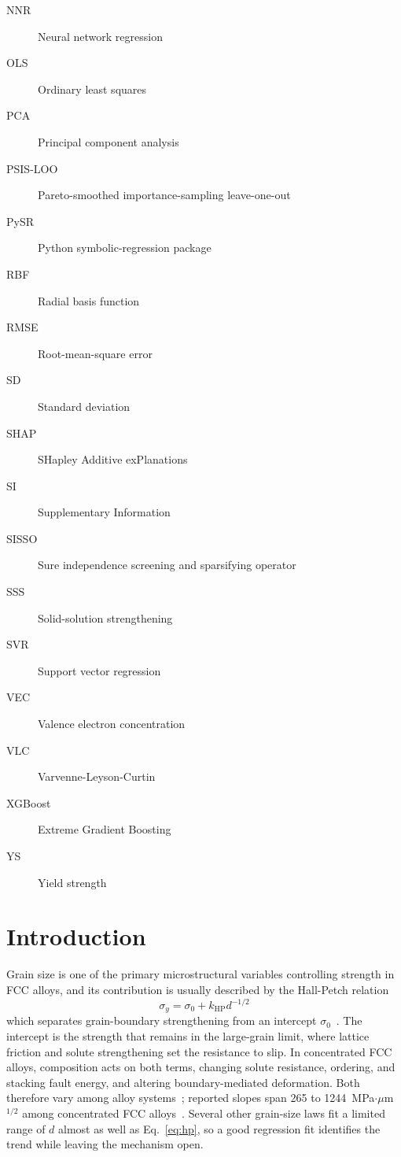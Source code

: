 \documentclass[5p,times,twocolumn]{elsarticle}
\begin{document}
{\begin{description}
\item[NNR] Neural network regression
\item[OLS] Ordinary least squares
\item[PCA] Principal component analysis
\item[PSIS-LOO] Pareto-smoothed importance-sampling leave-one-out
\item[PySR] Python symbolic-regression package
\item[RBF] Radial basis function
\item[RMSE] Root-mean-square error
\item[SD] Standard deviation
\item[SHAP] SHapley Additive exPlanations
\item[SI] Supplementary Information
\item[SISSO] Sure independence screening and sparsifying operator
\item[SSS] Solid-solution strengthening
\item[SVR] Support vector regression
\item[VEC] Valence electron concentration
\item[VLC] Varvenne-Leyson-Curtin
\item[XGBoost] Extreme Gradient Boosting
\item[YS] Yield strength

\end{description}
}

\section{Introduction}
\label{sec:intro}

Grain size is one of the primary microstructural variables controlling strength in FCC alloys, and its contribution is usually described by the Hall-Petch relation
\begin{equation}
\sigma_y=\sigma_0+k_{\mathrm{HP}}d^{-1/2}
\label{eq:hp}
\end{equation}
which separates grain-boundary strengthening from an intercept $\sigma_0$~\cite{Hall1951,Petch1953,Cordero2016}. The intercept is the strength that remains in the large-grain limit, where lattice friction and solute strengthening set the resistance to slip. In concentrated FCC alloys, composition acts on both terms, changing solute resistance, ordering, and stacking fault energy, and altering boundary-mediated deformation. Both therefore vary among alloy systems~\cite{Otto2013,Yoshida2017,LiKHP2024}; reported slopes span 265 to 1244~MPa$\cdot\mu$m$^{1/2}$ among concentrated FCC alloys~\cite{Yoshida2017,Jagetia2021}. Several other grain-size laws fit a limited range of $d$ almost as well as Eq.~\eqref{eq:hp}, so a good regression fit identifies the trend while leaving the mechanism open.
\end{document}
